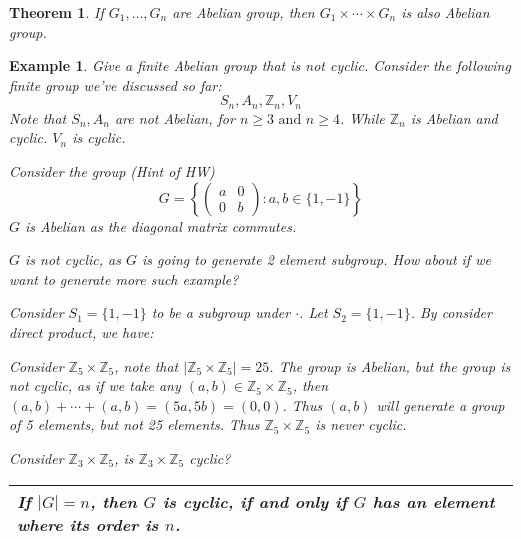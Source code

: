 \documentclass{article}
\theoremstyle{MyNonumberplain}
\theoremstyle{break}
\newcommand{\infixand}{\text{ and }}
\theoremstyle{break}
\newtheorem{theorem}{Theorem}[section]
\newtheorem{example}{Example}[section]
\theoremstyle{break}
\theoremstyle{definition}
\theoremstyle{break}
\begin{document}
\begin{thmbox}
    \begin{theorem}
        If $G_1, \ldots, G_n$ are Abelian group, then $G_1 \times \cdots \times G_n$
        is also Abelian group. 
    \end{theorem}

\end{thmbox}


\begin{expbox}
    \begin{example}
        Give a finite Abelian group that is not cyclic.
        Consider the following finite group we've discussed so far:
        \[ S_n, A_n, \mathbb{Z}_n, V_n \]
        Note that $S_n, A_n$ are not Abelian, for $n \geq 3 \infixand n \geq 4$. While
        $\mathbb{Z}_n$ is Abelian and cyclic. $V_n$ is cyclic.\bigskip

        Consider the group (Hint of HW)
        \[ G = \left\{ \left(\begin{array}{cc}
            a & 0\\
            0 & b
        \end{array}\right) : a, b \in \{ 1, - 1 \} \right\} \]
        $G$ is Abelian as the diagonal matrix commutes.\bigskip

        $G$ is not cyclic, as $G$ is going to generate 2 element subgroup. How about
        if we want to generate more such example?\bigskip

        Consider $S_1 = \{ 1, - 1 \}$ to be a subgroup under $\cdot$. Let $S_2 = \{ 1,
        - 1 \}$. By consider direct product, we have:\bigskip

        Consider $\mathbb{Z}_5 \times \mathbb{Z}_5$, note that $| \mathbb{Z}_5 \times
        \mathbb{Z}_5 | = 25$. The group is Abelian, but the group is not cyclic, as if
        we take any $(a, b) \in \mathbb{Z}_5 \times \mathbb{Z}_5$, then $(a, b) +
        \cdots + (a, b) = (5 a, 5 b) = (0, 0)$. Thus $(a, b)$ will generate a group of
        5 elements, but not 25 elements. Thus $\mathbb{Z}_5 \times \mathbb{Z}_5$ is
        never cyclic.\bigskip

        Consider $\mathbb{Z}_3 \times \mathbb{Z}_5$, is $\mathbb{Z}_3 \times
        \mathbb{Z}_5$ cyclic?\bigskip

        {\noindent}\begin{tabularx}{1.0\textwidth}{|@{}X@{}|}
        \hline
        If $| G | = n$, then $G$ is cyclic, if and only if $G$ has an element where
        its order is $n$.\\
        \hline
        \end{tabularx}\bigskip


\end{example}
\end{expbox}
\end{document}
